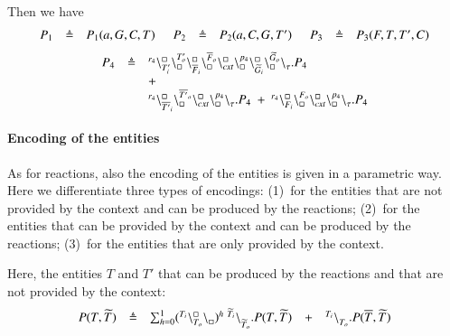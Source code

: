 Then we have 
\[
\begin{array}{lcl @{\hspace{0.5cm}}lcl @{\hspace{0.5cm}}lcl }
P_1 & \defeq & P_1(a,G,C,T) &   P_2 & \defeq & P_2(a,C,G,T') &   P_3 & \defeq & P_3(F,T,T',C)  \\
\end{array}
\]
\[
\begin{array}{lcl}
P_4 & \triangleq &{}^{r_4}\backslash_{T'_i}^{\scriptstyle {\square}}\backslash_{\scriptstyle {\square}}^{T'_o}
                                                     \backslash_{\overline{F}_i}^{\scriptstyle {\square}}\backslash_{\scriptstyle {\square}}^{\overline{F}_o}
					        \backslash_{\mathit{cxt}}^{\scriptstyle {\square}}\backslash_{\scriptstyle {\square}}^{p_4}
					        \backslash_{\widetilde{G}_i}^{\scriptstyle {\square}}\backslash_{\scriptstyle {\square}}^{\widetilde{G}_o}
			\backslash_{\tau}^{}.P_4  \\
				&& +\\
&&{}^{r_4}\backslash_{\overline{T'}_i}^{\scriptstyle {\square}}\backslash_{\scriptstyle {\square}}^{\overline{T'}_o}\backslash_{cxt}^{\scriptstyle {\square}}\backslash_{\scriptstyle {\square}}^{p_4} \backslash_{\tau}^{}.P_4 \ +\  {}^{r_4}\backslash_{F_i}^{\scriptstyle {\square}}\backslash_{\scriptstyle {\square}}^{F_o}\backslash_{\mathit{cxt}}^{\scriptstyle {\square}}\backslash_{\scriptstyle {\square}}^{p_4} \backslash_{\tau}^{}.P_4
\end{array}
\]
\noindent

\paragraph{Encoding of the entities}

As for reactions, also the encoding of the entities is given in a parametric way.
Here we differentiate three types of encodings: (1)~for the entities that are not  provided by the context and  can be produced by the reactions; (2)~for the entities that can be provided by the context and can be  produced by the reactions; (3)~for the entities that are only provided by the context.

Here, the entities $T$ and $T'$ that can be produced by the reactions and that are not provided by the context:
\[
\begin{array}{lcllcl}
P (T,\widetilde{T})&\triangleq & \sum_{h=0}^1 ({}^{T_i}\backslash_{T_o}^{\scriptstyle {\square}}\backslash_{\scriptstyle {\square}}^{})^h\ {}^{\widetilde{T}_i} \backslash_{\widetilde{T}_o}^{}.P (T,\widetilde{T})
& +  & {}^{T_i} \backslash_{T_o}^{}.P (\overline{T},\widetilde{T}) \\
\end{array}
\]

